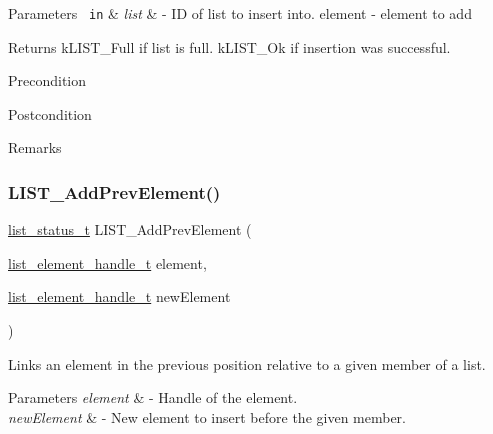  
\begin{DoxyParams}[1]{Parameters}
\mbox{\texttt{ in}}  & {\em list} & -\/ ID of list to insert into. element -\/ element to add\\
\hline
\end{DoxyParams}
\begin{DoxyReturn}{Returns}
k\+L\+I\+S\+T\+\_\+\+Full if list is full. k\+L\+I\+S\+T\+\_\+\+Ok if insertion was successful.
\end{DoxyReturn}
\begin{DoxyPrecond}{Precondition}

\end{DoxyPrecond}
\begin{DoxyPostcond}{Postcondition}

\end{DoxyPostcond}
\begin{DoxyRemark}{Remarks}
\begin{DoxyVerb}\end{DoxyVerb}
 
\end{DoxyRemark}
\mbox{\label{group___generic_list_ga715b202be720d60e063a6b0dbac502a9}} 
\subsubsection{\texorpdfstring{LIST\_AddPrevElement()}{LIST\_AddPrevElement()}}
{\footnotesize\ttfamily \mbox{\hyperlink{group___generic_list_gaae3dc4a15b24287b8c3ac8706195aa7e}{list\+\_\+status\+\_\+t}} L\+I\+S\+T\+\_\+\+Add\+Prev\+Element (\begin{DoxyParamCaption}\item[{\mbox{\hyperlink{structlist__element__tag}{list\+\_\+element\+\_\+handle\+\_\+t}}}]{element,  }\item[{\mbox{\hyperlink{structlist__element__tag}{list\+\_\+element\+\_\+handle\+\_\+t}}}]{new\+Element }\end{DoxyParamCaption})}



Links an element in the previous position relative to a given member of a list. 


\begin{DoxyParams}{Parameters}
{\em element} & -\/ Handle of the element. \\
\hline
{\em new\+Element} & -\/ New element to insert before the given member.\\
\hline
\end{DoxyParams}

